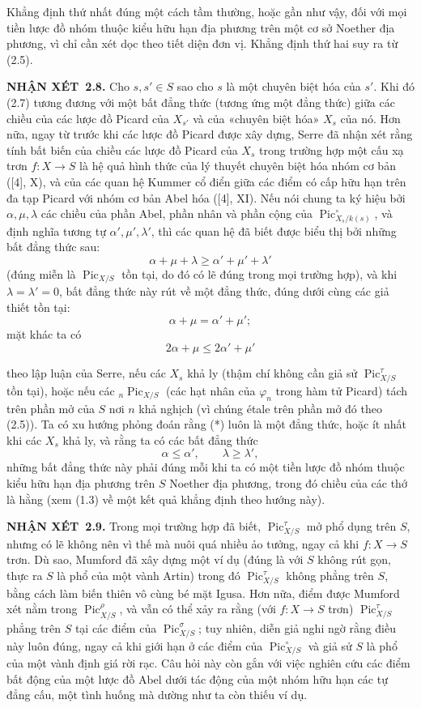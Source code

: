 \documentclass[11pt,twoside,openany]{book}
\numberwithin{equation}{section}
\newcommand{\src}[1]{%
  \phantomsection\hypertarget{src:\fgasourceid:#1}{}%
  \marginpar{\raggedleft\footnotesize\sffamily #1}%
}
\newcommand{\fgasourceid}{unset}
\newcommand{\result}[2]{\par\medskip\noindent\textbf{#1\if\relax\detokenize{#2}\relax\else\ #2\fi.}\quad}
\begin{document}
Khẳng định thứ nhất đúng một cách tầm thường, hoặc gần như vậy, đối với mọi
tiền lược đồ nhóm thuộc kiểu hữu hạn địa phương trên một cơ sở Noether địa
phương, vì chỉ cần xét dọc theo tiết diện đơn vị. Khẳng định thứ hai suy ra từ
(2.5).

\result{NHẬN XÉT}{2.8} Cho $s,s'\in S$ sao cho $s$ là một chuyên biệt hóa của
$s'$. Khi đó (2.7) tương đương với một bất đẳng thức (tương ứng một đẳng thức)
giữa các chiều của các lược đồ Picard của $X_{s'}$ và của «chuyên biệt hóa»
$X_s$ của nó. Hơn nữa, ngay từ trước khi các lược đồ Picard được xây dựng,
Serre đã nhận xét rằng tính bất biến của chiều các lược đồ Picard của $X_s$ trong
trường hợp một cấu xạ trơn $f:X\longrightarrow S$ là hệ quả hình thức của lý
thuyết chuyên biệt hóa nhóm cơ bản ([4], X), và của các quan hệ Kummer cổ điển
giữa các điểm có cấp hữu hạn trên đa tạp Picard với nhóm cơ bản Abel hóa ([4],
XI). Nếu nói chung ta ký hiệu bởi $\alpha,\mu,\lambda$ các chiều của phần Abel,
phần nhân và phần cộng của $\operatorname{Pic}_{X_s/k(s)}^\circ$, và định
nghĩa tương tự $\alpha',\mu',\lambda'$, thì các quan hệ đã biết được biểu thị
bởi những bất đẳng thức sau:
\[
\tag{*}\alpha+\mu+\lambda\geq\alpha'+\mu'+\lambda'
\]
(đúng miễn là $\operatorname{Pic}_{X/S}$ tồn tại, do đó có lẽ đúng trong mọi
trường hợp), và khi $\lambda=\lambda'=0$, bất đẳng thức này rút về một đẳng
thức, đúng dưới cùng các giả thiết tồn tại:
\[
\alpha+\mu=\alpha'+\mu' ;
\]
mặt khác ta có
\[
\tag{**}2\alpha+\mu\leq2\alpha'+\mu'
\]
\src{235}
theo lập luận của Serre, nếu các $X_s$ khả ly (thậm chí không cần giả sử
$\operatorname{Pic}_{X/S}^\tau$ tồn tại), hoặc nếu các
${}_n\operatorname{Pic}_{X/S}$ (các hạt nhân của $\varphi_n$ trong hàm tử
Picard) tách trên phần mở của $S$ nơi $n$ khả nghịch (vì chúng étale trên phần mở đó theo (2.5)). Ta có xu hướng
phỏng đoán rằng (*) luôn là một đẳng thức, hoặc ít nhất khi các $X_s$ khả ly,
và rằng ta có các bất đẳng thức
\[
\tag{***}\alpha\leq\alpha',\qquad\lambda\geq\lambda',
\]
những bất đẳng thức này phải đúng mỗi khi ta có một tiền lược đồ nhóm thuộc
kiểu hữu hạn địa phương trên $S$ Noether địa phương, trong đó chiều của các
thớ là hằng (xem (1.3) về một kết quả khẳng định theo hướng này).

\result{NHẬN XÉT}{2.9} Trong mọi trường hợp đã biết,
$\operatorname{Pic}_{X/S}^\tau$ mở phổ dụng trên $S$, nhưng có lẽ không nên vì
thế mà nuôi quá nhiều ảo tưởng, ngay cả khi $f:X\longrightarrow S$ trơn. Dù
sao, Mumford đã xây dựng một ví dụ (đúng là với $S$ không rút gọn, thực ra $S$
là phổ của một vành Artin) trong đó $\operatorname{Pic}_{X/S}^\tau$ không
phẳng trên $S$, bằng cách làm biến thiên vô cùng bé mặt Igusa. Hơn nữa, điểm
được Mumford xét nằm trong $\operatorname{Pic}_{X/S}^\rho$, và vẫn có thể xảy
ra rằng (với $f:X\longrightarrow S$ trơn) $\operatorname{Pic}_{X/S}^\tau$
phẳng trên $S$ tại các điểm của $\operatorname{Pic}_{X/S}^\sigma$; tuy nhiên,
diễn giả nghi ngờ rằng điều này luôn đúng, ngay cả khi giới hạn ở các điểm của
$\operatorname{Pic}_{X/S}^\circ$ và giả sử $S$ là phổ của một vành định giá
rời rạc. Câu hỏi này còn gắn với việc nghiên cứu các điểm bất động của một
lược đồ Abel dưới tác động của một nhóm hữu hạn các tự đẳng cấu, một tình
huống mà dường như ta còn thiếu ví dụ.
\end{document}

